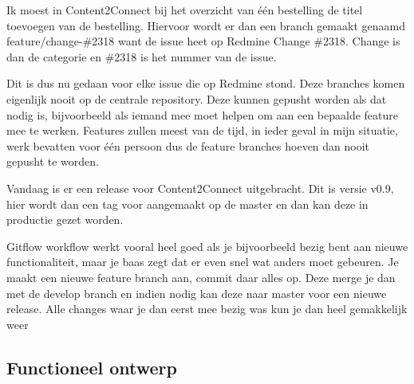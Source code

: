 \newline

Ik moest in Content2Connect bij het overzicht van één bestelling de titel toevoegen van de bestelling. Hiervoor wordt er dan een branch gemaakt genaamd feature/change-\#2318 want de issue heet op Redmine Change \#2318. Change is dan de categorie en \#2318 is het nummer van de issue.

Dit is dus nu gedaan voor elke issue die op Redmine stond. Deze branches komen eigenlijk nooit op de centrale repository. Deze kunnen gepusht worden als dat nodig is, bijvoorbeeld als iemand mee moet helpen om aan een bepaalde feature mee te werken. Features zullen meest van de tijd, in ieder geval in mijn situatie, werk bevatten voor één persoon dus de feature branches hoeven dan nooit gepusht te worden.

\newline

Vandaag is er een release voor Content2Connect uitgebracht. Dit is versie v0.9, hier wordt dan een tag voor aangemaakt op de master en dan kan deze in productie gezet worden.

Gitflow workflow werkt vooral heel goed als je bijvoorbeeld bezig bent aan nieuwe functionaliteit, maar je baas zegt dat er even snel wat anders moet gebeuren. Je maakt een nieuwe feature branch aan, commit daar alles op. Deze merge je dan met de develop branch en indien nodig kan deze naar master voor een nieuwe release. Alle changes waar je dan eerst mee bezig was kun je dan heel gemakkelijk weer 

\subsection{Functioneel ontwerp}

